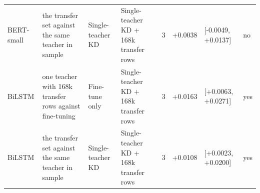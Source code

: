 \begin{table}[t]
\begin{tabular}{llllrrll}
BERT-small & the transfer set against the same teacher in sample & Single-teacher KD & Single-teacher KD + 168k transfer rows & 3 & +0.0038 & [-0.0049, +0.0137] & no \\
BiLSTM & one teacher with 168k transfer rows against fine-tuning & Fine-tune only & Single-teacher KD + 168k transfer rows & 3 & +0.0163 & [+0.0063, +0.0271] & yes \\
BiLSTM & the transfer set against the same teacher in sample & Single-teacher KD & Single-teacher KD + 168k transfer rows & 3 & +0.0108 & [+0.0023, +0.0200] & yes \\
\bottomrule
\end{tabular}
\end{table}